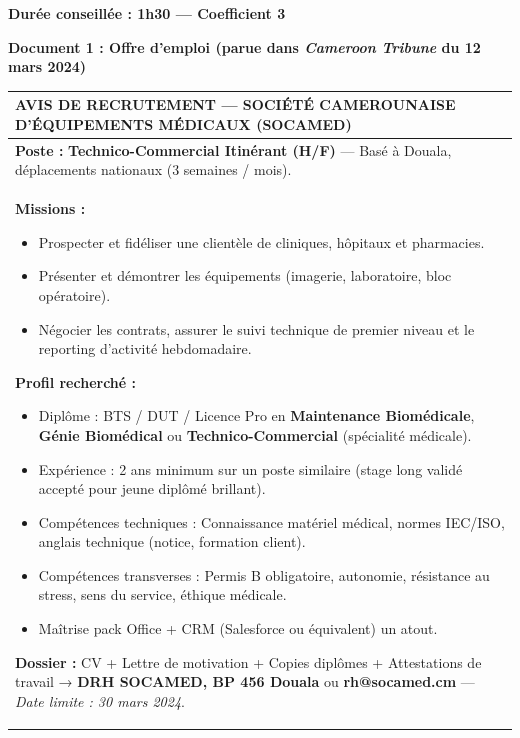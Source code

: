 \documentclass[11pt]{article}
\begin{document}
\begin{exercice}
\textbf{Durée conseillée : 1h30 — Coefficient 3}

\textbf{Document 1 : Offre d'emploi (parue dans \textit{Cameroon Tribune} du 12 mars 2024)}

\begin{center}
\begin{tabularx}{\linewidth}{|X|}\hline
\rowcolor{popblueL} \textbf{AVIS DE RECRUTEMENT — SOCIÉTÉ CAMEROUNAISE D'ÉQUIPEMENTS MÉDICAUX (SOCAMED)} \\
\hline
\textbf{Poste :} \textbf{Technico-Commercial Itinérant (H/F)} — Basé à Douala, déplacements nationaux (3 semaines / mois). \\
\textbf{Missions :}
\begin{itemize}
\item Prospecter et fidéliser une clientèle de cliniques, hôpitaux et pharmacies.
\item Présenter et démontrer les équipements (imagerie, laboratoire, bloc opératoire).
\item Négocier les contrats, assurer le suivi technique de premier niveau et le reporting d'activité hebdomadaire.
\end{itemize}
\textbf{Profil recherché :}
\begin{itemize}
\item Diplôme : BTS / DUT / Licence Pro en \textbf{Maintenance Biomédicale}, \textbf{Génie Biomédical} ou \textbf{Technico-Commercial} (spécialité médicale).
\item Expérience : 2 ans minimum sur un poste similaire (stage long validé accepté pour jeune diplômé brillant).
\item Compétences techniques : Connaissance matériel médical, normes IEC/ISO, anglais technique (notice, formation client).
\item Compétences transverses : Permis B obligatoire, autonomie, résistance au stress, sens du service, éthique médicale.
\item Maîtrise pack Office + CRM (Salesforce ou équivalent) un atout.
\end{itemize}
\textbf{Dossier :} CV + Lettre de motivation + Copies diplômes + Attestations de travail → \textbf{DRH SOCAMED, BP 456 Douala} ou \textbf{rh@socamed.cm} — \textit{Date limite : 30 mars 2024}. \\
\hline
\end{tabularx}
\end{center}


\end{exercice}
\end{document}
